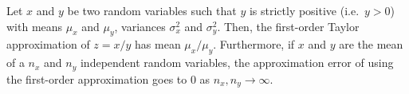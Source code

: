 \begin{lemma}
\label{lem:variance-ratio}
  Let $x$ and $y$ be two random variables such that $y$ is strictly positive (i.e.\ $y > 0$) with means $\mu_x$ and $\mu_y$, variances $\sigma^2_x$ and $\sigma^2_y$. %
  Then, the first-order Taylor approximation of $z = x / y$ has mean $\mu_x / \mu_y$.
Furthermore, if $x$ and $y$ are the mean of a $n_x$ and $n_y$ independent random variables, 
the approximation error of using the first-order approximation goes to 0 as $n_x, n_y \to \infty$.
\end{lemma}
